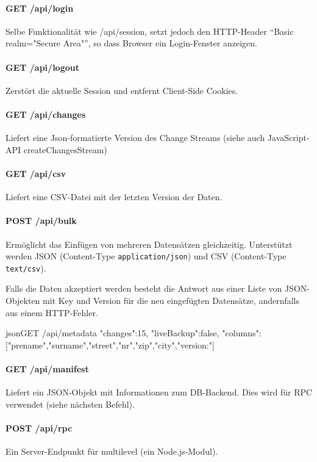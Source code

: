 \paragraph{GET /api/login}
Selbe Funktionalität wie /api/session, setzt jedoch den HTTP-Header ``Basic realm="Secure Area"'', so dass Browser ein Login-Fenster anzeigen.

\paragraph{GET /api/logout}
Zerstört die aktuelle Session und entfernt Client-Side Cookies.

\paragraph{GET /api/changes}
Liefert eine Json-formatierte Version des Change Streams (siehe auch JavaScript-API createChangesStream) 

\paragraph{GET /api/csv}
Liefert eine CSV-Datei mit der letzten Version der Daten.

\paragraph{POST /api/bulk}
Ermöglicht das Einfügen von mehreren Datensätzen gleichzeitig. Unterstützt werden JSON (Content-Type \texttt{application/json}) und CSV (Content-Type \texttt{text/csv}).

Falls die Daten akzeptiert werden besteht die Antwort aus einer Liste von JSON-Objekten mit Key und Version für die neu eingefügten Datensätze, andernfalls aus einem HTTP-Fehler.

\begin{srclst}{json}{GET /api/metadata}
{
    "changes":15, 
    "liveBackup":false, 
    "columns":["prename","surname","street","nr","zip","city","version:"]
}
\end{srclst}

\paragraph{GET /api/manifest}
Liefert ein JSON-Objekt mit Informationen zum DB-Backend. Dies wird für RPC verwendet (siehe nächsten Befehl).

\paragraph{POST /api/rpc}
Ein Server-Endpunkt für multilevel (ein Node.js-Modul).

